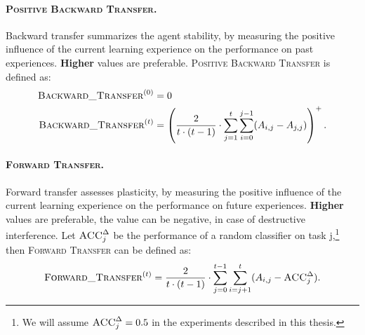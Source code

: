 \paragraph{\textsc{Positive Backward Transfer}.} Backward transfer summarizes the agent stability, by measuring the positive influence of the current learning experience on the performance on past experiences. \textbf{Higher} values are preferable. \textsc{Positive Backward Transfer} is defined as:
\begin{align*}
	\textsc{Backward\_Transfer}^{(0)} &= 0\\
	\textsc{Backward\_Transfer}^{(t)} &= \left(\frac{2}{t \cdot (t - 1)}\cdot \sum_{j=1}^{t} \sum_{i=0}^{j-1} ({A}_{i,j} - {A}_{j,j}) \right)^+.
\end{align*}

\paragraph{\textsc{Forward Transfer}.} Forward transfer assesses plasticity, by measuring the positive influence of the current learning experience on the performance on future experiences. \textbf{Higher} values are preferable, the value can be negative, in case of destructive interference. Let $\textsc{ACC}_j^\Delta$ be the performance of a random classifier on task j,\footnote{We will assume $\textsc{ACC}_j^\Delta = 0.5$ in the experiments described in this thesis.} then \textsc{Forward Transfer} can be defined as:
\begin{equation*}
	\textsc{Forward\_Transfer}^{(t)} = \frac{2}{t \cdot (t - 1)}\cdot \sum_{j=0}^{t-1} \sum_{i=j+1}^{t} ({A}_{i,j} - \textsc{ACC}_j^\Delta).
\end{equation*}

